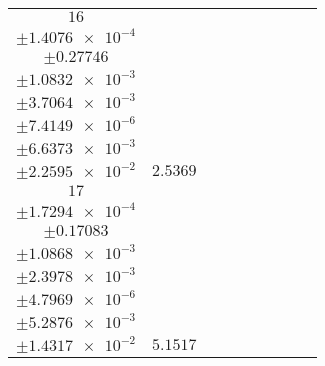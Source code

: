 \documentclass[8pt]{article}
\begin{document}
\begin{longtable}[l]{c c c c c c c c c}
$\num{16}$ & \begin{tabular}[c]{@{}c@{}}$\num{2.9749e-2}$ \\ $\pm\num{1.4076e-4}$\end{tabular} & \begin{tabular}[c]{@{}c@{}}$\num{-0.58787}$ \\ $\pm\num{0.27746}$\end{tabular} & \begin{tabular}[c]{@{}c@{}}$\num{2.5916}$ \\ $\pm\num{1.0832e-3}$\end{tabular} & \begin{tabular}[c]{@{}c@{}}$\num{1.6119e+3}$ \\ $\pm\num{3.7064e-3}$\end{tabular} & \begin{tabular}[c]{@{}c@{}}$\num{3.2247}$ \\ $\pm\num{7.4149e-6}$\end{tabular} & \begin{tabular}[c]{@{}c@{}}$\num{1.1602}$ \\ $\pm\num{6.6373e-3}$\end{tabular} & \begin{tabular}[c]{@{}c@{}}$\num{4.1545}$ \\ $\pm\num{2.2595e-2}$\end{tabular} & $\num{2.5369}$\\
$\num{17}$ & \begin{tabular}[c]{@{}c@{}}$\num{6.6248e-2}$ \\ $\pm\num{1.7294e-4}$\end{tabular} & \begin{tabular}[c]{@{}c@{}}$\num{0.46099}$ \\ $\pm\num{0.17083}$\end{tabular} & \begin{tabular}[c]{@{}c@{}}$\num{6.9518}$ \\ $\pm\num{1.0868e-3}$\end{tabular} & \begin{tabular}[c]{@{}c@{}}$\num{1.6162e+3}$ \\ $\pm\num{2.3978e-3}$\end{tabular} & \begin{tabular}[c]{@{}c@{}}$\num{3.2334}$ \\ $\pm\num{4.7969e-6}$\end{tabular} & \begin{tabular}[c]{@{}c@{}}$\num{1.8249}$ \\ $\pm\num{5.2876e-3}$\end{tabular} & \begin{tabular}[c]{@{}c@{}}$\num{4.5467}$ \\ $\pm\num{1.4317e-2}$\end{tabular} & $\num{5.1517}$\\

\end{longtable}
\end{document}
